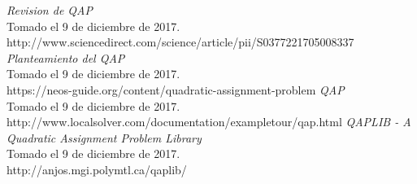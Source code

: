\documentclass[12pts,letterpaper]{article}
\begin{document}
	\begin{thebibliography}{6}
			\emph{Revision de QAP}\\
			Tomado el 9 de diciembre de 2017.\\
			http://www.sciencedirect.com/science/article/pii/S0377221705008337
			\emph{Planteamiento del QAP}\\
			Tomado el 9 de diciembre de 2017.\\
			https://neos-guide.org/content/quadratic-assignment-problem
			\emph{QAP}\\
			Tomado el 9 de diciembre de 2017.\\
			http://www.localsolver.com/documentation/exampletour/qap.html
			\emph{QAPLIB - A Quadratic Assignment Problem Library}\\
			Tomado el 9 de diciembre de 2017.\\
			http://anjos.mgi.polymtl.ca/qaplib/

	\end{thebibliography}
\end{document}

